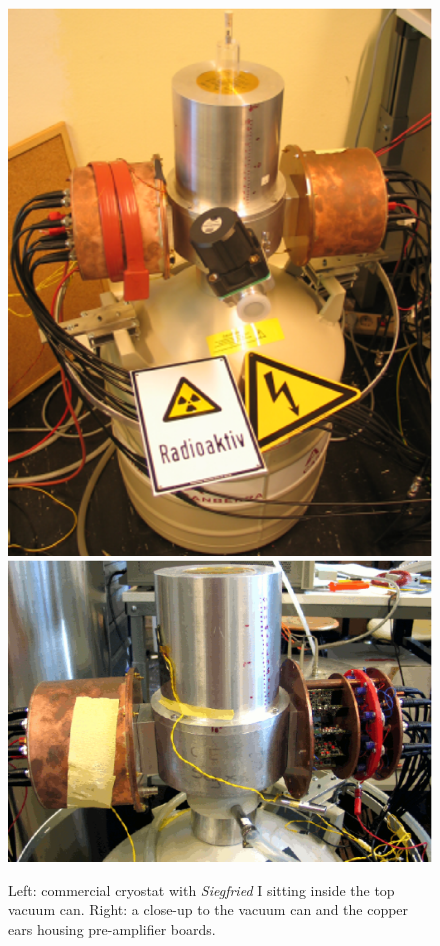 \begin{figure}[tbhp]
  \centering
  \includegraphics[height=0.25\textheight]{comcryo}\hfil
  \includegraphics[height=0.25\textheight]{SIears}
  \caption{Left: commercial cryostat with \emph{Siegfried} I sitting     inside the top vacuum can. Right: a close-up to the vacuum can and     the copper ears housing pre-amplifier boards.}
  \label{fig:tt:comcryo}
\end{figure}


